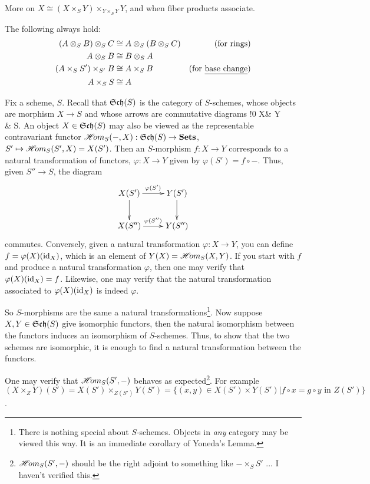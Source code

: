 More on $X\cong (X\times_S Y)\times_{Y\times_S Y}Y$, and when
fiber products associate. 

The following always hold:
\begin{align*}
(A\otimes_S B)\otimes_S C &\cong A\otimes_S (B\otimes_S C) &\text{(for rings)}\\
A\otimes_S B &\cong B\otimes_S A \\
(A\times_S S')\times_{S'} B &\cong A\times_S B & \text{(for \underline{base change})}\\
A\times_S S &\cong A
\end{align*}


Fix a scheme, $S$.  Recall that $\mathfrak{Sch}(S)$ is the category of
$S$-schemes, whose objects are morphism $X\to S$ and whose arrows
are commutative diagrams
 \xymatrix@!0 { X\ar[r]\ar[dr] & Y\ar[d] \\ & S}.
 An object $X\in \mathfrak{Sch}(S)$ may also be viewed as the representable
 contravariant functor $\mathscr{H}\!om_S(-,X):\mathfrak{Sch}(S)\to {\bf Sets}$,
 $S'\mapsto \mathscr{H}\!om_S(S',X) = X(S')$.  Then an $S$-morphism $f:X\to
 Y$ corresponds to a natural transformation of functors, $\varphi:
 X\to Y$ given by $\varphi(S') = f\circ -$.  Thus, given $S''\to S$, the diagram
 \[\xymatrix{
    X(S')\ar[r]^{\varphi(S')} \ar[d] & Y(S')\ar[d]\\
    X(S'') \ar[r]^{\varphi(S'')} & Y(S'')
 }\]
 commutes.  Conversely, given a natural transformation $\varphi:
 X\to Y$, you can define $f =
 \varphi(X)(\text{id}_X)$, which is an element of $Y(X) = \mathscr{H}\!om_S(X,Y)$.
 If you start with $f$ and produce a natural transformation
 $\varphi$, then one may verify that $\varphi(X)(\text{id}_X) =f$.
 Likewise, one may verify that the natural transformation
 associated to $\varphi(X)(\text{id}_X)$ is indeed $\varphi$.

 So $S$-morphisms are the same a natural transformations\footnote{There is
 nothing special about $S$-schemes.  Objects in \emph{any} category may be viewed this
 way.  It is an immediate corollary of Yoneda's Lemma.}.  Now
 suppose $X, Y\in \mathfrak{Sch}(S)$ give isomorphic functors, then the
 natural isomorphism between the functors induces an isomorphism
 of $S$-schemes.  Thus, to show that the two schemes are
 isomorphic, it is enough to find a natural transformation between
 the functors.

One may verify that $\mathscr{H}\!om_S(S',-)$ behaves as
expected\footnote{$\mathscr{H}\!om_S(S',-)$ should be the right adjoint to
something like $-\times_S S'$ ... I haven't verified this.}. For
example $(X\times_Z Y)(S') = X(S')\times_{Z(S')} Y(S') =
\{(x,y)\in X(S')\times Y(S')| f\circ x = g\circ y \text{ in }
Z(S')\}$.

